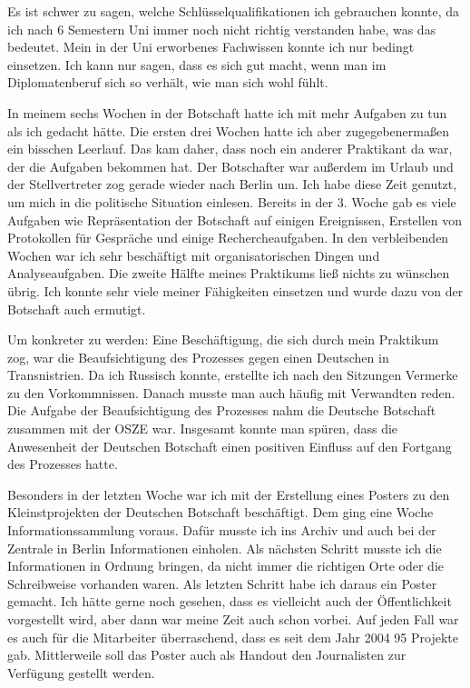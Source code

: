\documentclass{../../sem_paper}
\begin{document}
Es ist schwer zu sagen, welche Schlüsselqualifikationen ich gebrauchen konnte, da ich nach 6 Semestern Uni immer noch nicht richtig verstanden habe, was das bedeutet. Mein in der Uni erworbenes Fachwissen konnte ich nur bedingt einsetzen. Ich kann nur sagen, dass es sich gut macht, wenn man im Diplomatenberuf sich so verhält, wie man sich wohl fühlt.

In meinem sechs Wochen in der Botschaft hatte ich mit mehr Aufgaben zu tun als ich gedacht hätte. Die ersten drei Wochen hatte ich aber zugegebenermaßen ein bisschen Leerlauf. Das kam daher, dass noch ein anderer Praktikant da war, der die Aufgaben bekommen hat. Der Botschafter war außerdem im Urlaub und der Stellvertreter zog gerade wieder nach Berlin um. Ich habe diese Zeit genutzt, um mich in die politische Situation einlesen. Bereits in der 3. Woche gab es viele Aufgaben wie Repräsentation der Botschaft auf einigen Ereignissen, Erstellen von Protokollen für Gespräche und einige Rechercheaufgaben. In den verbleibenden Wochen war ich sehr beschäftigt mit organisatorischen Dingen und Analyseaufgaben. Die zweite Hälfte meines Praktikums ließ nichts zu wünschen übrig. Ich konnte sehr viele meiner Fähigkeiten einsetzen und wurde dazu von der Botschaft auch ermutigt.

Um konkreter zu werden: Eine Beschäftigung, die sich durch mein Praktikum zog, war die Beaufsichtigung des Prozesses gegen einen Deutschen in Transnistrien. Da ich Russisch konnte, erstellte ich nach den Sitzungen Vermerke zu den Vorkommnissen. Danach musste man auch häufig mit Verwandten reden. Die Aufgabe der Beaufsichtigung des Prozesses nahm die Deutsche Botschaft zusammen mit der OSZE war. Insgesamt konnte man spüren, dass die Anwesenheit der Deutschen Botschaft einen positiven Einfluss auf den Fortgang des Prozesses hatte.

Besonders in der letzten Woche war ich mit der Erstellung eines Posters zu den Kleinstprojekten der Deutschen Botschaft beschäftigt. Dem ging eine Woche Informationssammlung voraus. Dafür musste ich ins Archiv und auch bei der Zentrale in Berlin Informationen einholen. Als nächsten Schritt musste ich die Informationen in Ordnung bringen, da nicht immer die richtigen Orte oder die Schreibweise vorhanden waren. Als letzten Schritt habe ich daraus ein Poster gemacht. Ich hätte gerne noch gesehen, dass es vielleicht auch der Öffentlichkeit vorgestellt wird, aber dann war meine Zeit auch schon vorbei. Auf jeden Fall war es auch für die Mitarbeiter überraschend, dass es seit dem Jahr 2004 95 Projekte gab. Mittlerweile soll das Poster auch als Handout den Journalisten zur Verfügung gestellt werden.
\end{document}
